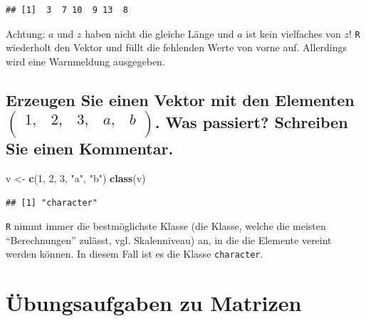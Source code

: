 \documentclass[12pt,a4paper]{article}
\newenvironment{Shaded}{\begin{snugshade}}{\end{snugshade}}
\newcommand{\DecValTok}[1]{\textcolor[rgb]{0.00,0.00,0.81}{#1}}
\newcommand{\FunctionTok}[1]{\textcolor[rgb]{0.13,0.29,0.53}{\textbf{#1}}}
\newcommand{\NormalTok}[1]{#1}
\newcommand{\OtherTok}[1]{\textcolor[rgb]{0.56,0.35,0.01}{#1}}
\newcommand{\StringTok}[1]{\textcolor[rgb]{0.31,0.60,0.02}{#1}}
\begin{document}
\begin{verbatim}
## [1]  3  7 10  9 13  8
\end{verbatim}

Achtung: \(a\) und \(z\) haben nicht die gleiche Länge und \(a\) ist
kein vielfaches von \(z\)! \texttt{R} wiederholt den Vektor und füllt
die fehlenden Werte von vorne auf. Allerdings wird eine Warnmeldung
ausgegeben.

\vspace{0.5cm}

\subsection{\texorpdfstring{Erzeugen Sie einen Vektor mit den Elementen
\(\begin{pmatrix} 1, & 2, & 3, & a, & b \\ \end{pmatrix}\). Was
passiert? Schreiben Sie einen
Kommentar.}{Erzeugen Sie einen Vektor mit den Elementen \textbackslash begin\{pmatrix\} 1, \& 2, \& 3, \& a, \& b \textbackslash\textbackslash{} \textbackslash end\{pmatrix\}. Was passiert? Schreiben Sie einen Kommentar.}}\label{erzeugen-sie-einen-vektor-mit-den-elementen-beginpmatrix-1-2-3-a-b-endpmatrix.-was-passiert-schreiben-sie-einen-kommentar.}

\begin{Shaded}
\begin{Highlighting}[]
\NormalTok{    v }\OtherTok{\textless{}{-}} \FunctionTok{c}\NormalTok{(}\DecValTok{1}\NormalTok{, }\DecValTok{2}\NormalTok{, }\DecValTok{3}\NormalTok{, }\StringTok{"a"}\NormalTok{, }\StringTok{"b"}\NormalTok{)}
    \FunctionTok{class}\NormalTok{(v)}
\end{Highlighting}
\end{Shaded}

\begin{verbatim}
## [1] "character"
\end{verbatim}

\texttt{R} nimmt immer die bestmöglichste Klasse (die Klasse, welche die
meisten ``Berechnungen'' zulässt, vgl. Skalenniveau) an, in die die
Elemente vereint werden können. In diesem Fall ist es die Klasse
\texttt{character}.

\vspace{0.5cm}

\section{Übungsaufgaben zu
Matrizen}\label{uxfcbungsaufgaben-zu-matrizen}
\end{document}
